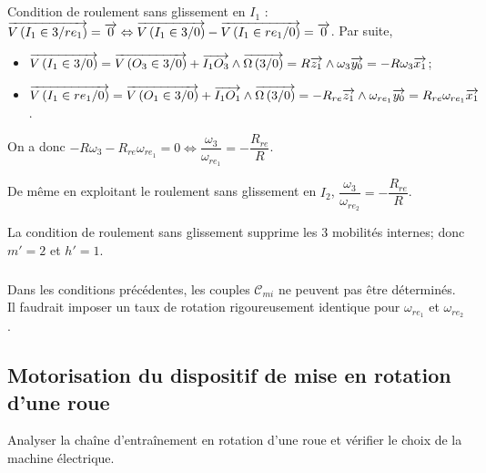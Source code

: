 \documentclass[10pt,fleqn]{article} %
\begin{document}
%

\subparagraph{}
Condition de roulement sans glissement en $I_1$ : $\overrightarrow{V\left( {I_1} \in {3}/{re_1}\right)} = \overrightarrow{0} \Leftrightarrow \overrightarrow{V\left( {I_1} \in {3}/{0}\right)}-\overrightarrow{V\left( {I_1} \in {re_1}/{0}\right)} = \overrightarrow{0}$. Par suite, 
\begin{itemize}
\item $\overrightarrow{V\left( {I_1} \in {3}/{0}\right)}=\overrightarrow{V\left( {O_3} \in {3}/{0}\right)}+\overrightarrow{I_1 O_3}\wedge \overrightarrow{\Omega\left( {3}/{0}\right)} = R\overrightarrow{z_1} \wedge \omega_3\overrightarrow{y_0}=-R\omega_3 \overrightarrow{x_1}$;
\item $\overrightarrow{V\left( {I_1} \in {re_1}/{0}\right)}=\overrightarrow{V\left( {O_1} \in {3}/{0}\right)}+\overrightarrow{I_1 O_1}\wedge \overrightarrow{\Omega\left( {3}/{0}\right)} = -R_{re}\overrightarrow{z_1} \wedge \omega_{re_1}\overrightarrow{y_0}=R_{re}\omega_{re_1} \overrightarrow{x_1}$.
\end{itemize}
On a donc $-R\omega_3 -R_{re}\omega_{re_1} =0 \Leftrightarrow\dfrac{\omega_3}{\omega_{re_1}}=-\dfrac{R_{re}}{R} $.

De même en exploitant le roulement sans glissement en $I_2$, $\dfrac{\omega_3}{\omega_{re_2}}=-\dfrac{R_{re}}{R} $. 

La condition de roulement sans glissement supprime les 3 mobilités internes; donc $m'=2$ et $h'=1$. 

\subparagraph{}
Dans les conditions précédentes, les couples $\mathcal{C}_{mi}$ ne peuvent pas être déterminés. Il faudrait imposer un taux de rotation rigoureusement identique pour $\omega_{re_1}$ et $\omega_{re_2}$. 


\subsection{Motorisation du dispositif de mise en rotation d'une roue}
\begin{obj}
Analyser la chaîne d’entraînement en rotation d’une roue et vérifier le choix de la machine électrique.
\end{obj}
\end{document}
